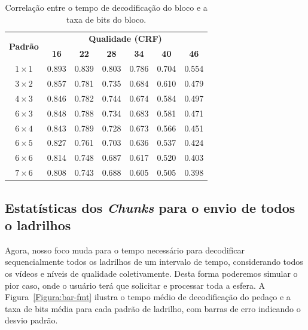 \begin{table}[htb]
\footnotesize
\caption{Correlação entre o tempo de decodificação do bloco e a taxa de bits do bloco.}
\label{tab:corr_list}
\begin{center}
\begin{tabular}{|c|c|c|c|c|c|c|}
    \hline
    \multirow{2}{*}{\textbf{Padrão}} & \multicolumn{6}{c|}{\bf Qualidade (CRF)} \\
    \cline{2-7}
      & \textbf{16} & \textbf{22} & \textbf{28} & \textbf{34} & \textbf{40} & \textbf{46} \\
    \hline
    $1\times 1$ & 0.893 & 0.839 & 0.803 & 0.786 & 0.704 & 0.554 \\
    \hline
    $3\times 2$ & 0.857 & 0.781 & 0.735 & 0.684 & 0.610 & 0.479 \\
    \hline
    $4\times 3$ & 0.846 & 0.782 & 0.744 & 0.674 & 0.584 & 0.497 \\
    \hline
    $6\times 3$ & 0.848 & 0.788 & 0.734 & 0.683 & 0.581 & 0.471 \\
    \hline
    $6\times 4$ & 0.843 & 0.789 & 0.728 & 0.673 & 0.566 & 0.451 \\
    \hline
    $6\times 5$ & 0.827 & 0.761 & 0.703 & 0.636 & 0.537 & 0.424 \\
    \hline
    $6\times 6$ & 0.814 & 0.748 & 0.687 & 0.617 & 0.520 & 0.403 \\
    \hline
    $7\times 6$ & 0.808 & 0.743 & 0.688 & 0.605 & 0.505 & 0.398 \\
    \hline
\end{tabular}
\end{center}
\end{table}

\subsection{Estatísticas dos \textit{Chunks} para o envio de todos o ladrilhos}

Agora, nosso foco muda para o tempo necessário para decodificar sequencialmente todos os ladrilhos de um intervalo de tempo, considerando todos os vídeos e níveis de qualidade coletivamente. Desta forma poderemos simular o pior caso, onde o usuário terá que solicitar e processar toda a esfera. A Figura~\ref{Figura:bar-fmt} ilustra o tempo médio de decodificação do pedaço e a taxa de bits média para cada padrão de ladrilho, com barras de erro indicando o desvio padrão.

